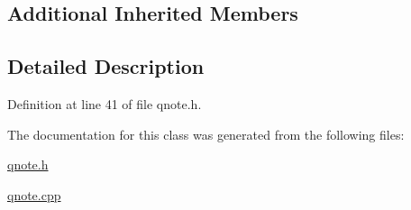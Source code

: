 \subsection*{Additional Inherited Members}


\subsection{Detailed Description}


Definition at line 41 of file qnote.\+h.



The documentation for this class was generated from the following files\+:\begin{DoxyCompactItemize}
\item 
\hyperlink{qnote_8h}{qnote.\+h}\item 
\hyperlink{qnote_8cpp}{qnote.\+cpp}\end{DoxyCompactItemize}
